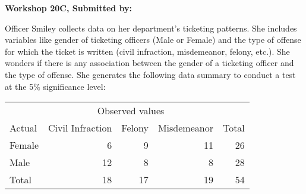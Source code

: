 \documentclass[11pt]{book}\usepackage[]{graphicx}\usepackage[]{color}
\begin{document}
\begin{exercises}
\begin{exercise}
\end{exercise}
\begin{solution}  %

\end{solution}


\clearpage

    \begin{exercise}  %

    \begin{center}
\begin{flushleft}\textbf{\large \hfill Workshop 20C, Submitted by: }\end{flushleft}

\end{center}

Officer Smiley collects data on her department's ticketing patterns. She includes variables like gender of ticketing officers (Male or Female) and the type of offense for which the ticket is written (civil infraction, misdemeanor, felony, etc.). She wonders if there is any association between the gender of a ticketing officer and the type of offense. She generates the following data summary to conduct a test at the 5\% significance level:

\begin{center}
\begin{tabular}{@{} lrrrr @{}} \hline
 & \multicolumn{3}{c}{Observed values} \\
Actual&	Civil Infraction&	Felony&	Misdemeanor&	Total  \\ \hline
Female&	6&	9&	11&	26 \\
Male&	12&	8&	8&	28 \\ \hline
Total&	18&	17&	19&	54 \\ \hline
\end{tabular}
\end{center}


\end{exercise}
\end{exercises}
\end{document}
